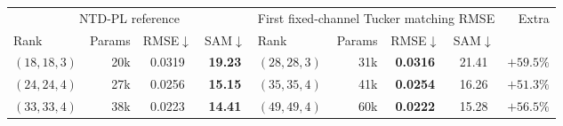 \begin{tabular}{@{}l r cc l r cc r@{}}
\toprule
\multicolumn{4}{c}{NTD-PL reference} &
\multicolumn{4}{c}{First fixed-channel Tucker matching RMSE} & Extra \\
\cmidrule(lr){1-4}\cmidrule(lr){5-8}
Rank & Params & RMSE$\downarrow$ & SAM$\downarrow$ &
Rank & Params & RMSE$\downarrow$ & SAM$\downarrow$ & \\
\midrule
\((18,18,3)\) & 20k & 0.0319 & \textbf{19.23} & \((28,28,3)\) & 31k & \textbf{0.0316} & 21.41 & \(+59.5\%\) \\
\((24,24,4)\) & 27k & 0.0256 & \textbf{15.15} & \((35,35,4)\) & 41k & \textbf{0.0254} & 16.26 & \(+51.3\%\) \\
\((33,33,4)\) & 38k & 0.0223 & \textbf{14.41} & \((49,49,4)\) & 60k & \textbf{0.0222} & 15.28 & \(+56.5\%\) \\
\bottomrule
\end{tabular}
